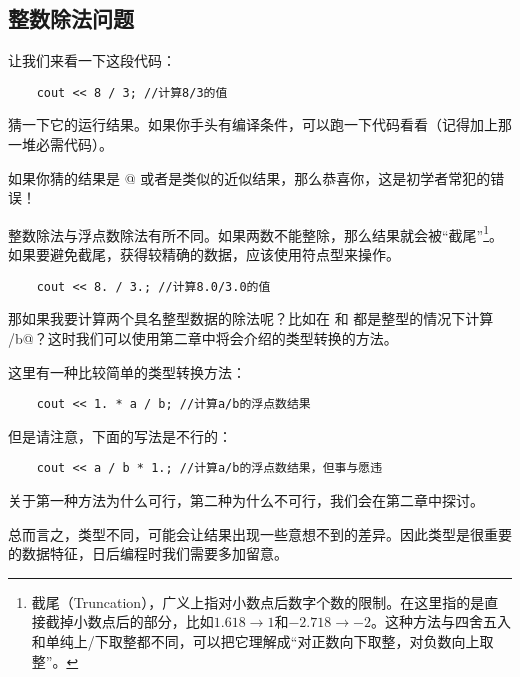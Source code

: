 \subsection*{整数除法问题}
让我们来看一下这段代码：
\begin{lstlisting}
    cout << 8 / 3; //计算8/3的值
\end{lstlisting}
猜一下它的运行结果。如果你手头有编译条件，可以跑一下代码看看（记得加上那一堆必需代码）。\par
如果你猜的结果是 @ 或者是类似的近似结果，那么恭喜你，这是初学者常犯的错误！\par
整数除法与浮点数除法有所不同。如果两数不能整除，那么结果就会被``截尾''\footnote{截尾（Truncation），广义上指对小数点后数字个数的限制。在这里指的是直接截掉小数点后的部分，比如$1.618\rightarrow1$和$-2.718\rightarrow-2$。这种方法与四舍五入和单纯上/下取整都不同，可以把它理解成``对正数向下取整，对负数向上取整''。}。如果要避免截尾，获得较精确的数据，应该使用符点型来操作。
\begin{lstlisting}
    cout << 8. / 3.; //计算8.0/3.0的值
\end{lstlisting}\par
那如果我要计算两个具名整型数据的除法呢？比如在 \lstinline@a@ 和 \lstinline@b@ 都是整型的情况下计算 \lstinline@a/b@？这时我们可以使用第二章中将会介绍的类型转换的方法。\par
这里有一种比较简单的类型转换方法：
\begin{lstlisting}
    cout << 1. * a / b; //计算a/b的浮点数结果
\end{lstlisting}
但是请注意，下面的写法是不行的：
\begin{lstlisting}
    cout << a / b * 1.; //计算a/b的浮点数结果，但事与愿违
\end{lstlisting}
关于第一种方法为什么可行，第二种为什么不可行，我们会在第二章中探讨。\par
总而言之，类型不同，可能会让结果出现一些意想不到的差异。因此类型是很重要的数据特征，日后编程时我们需要多加留意。\par
